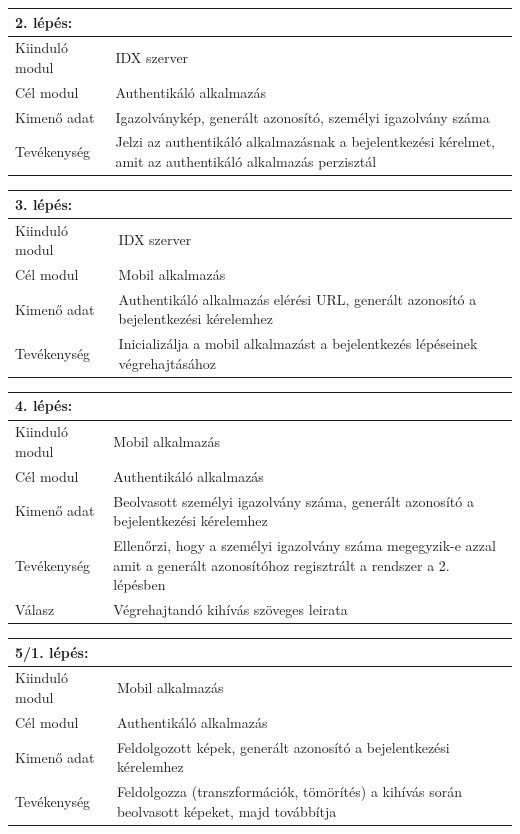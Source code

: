 \begin{tabular}{|p{3cm}|p{10cm} |}
   	\hline
	\textbf{2. lépés:} & \textbf{}\\ \hline
	Kiinduló modul & IDX szerver \\ \hline
	Cél modul & Authentikáló alkalmazás \\ \hline
	Kimenő adat & Igazolványkép, generált azonosító, személyi igazolvány száma \\ \hline
	Tevékenység & Jelzi az authentikáló alkalmazásnak a bejelentkezési kérelmet, amit az authentikáló alkalmazás perzisztál\\ \hline
\end{tabular}


\begin{tabular}{|p{3cm}|p{10cm} |}
   	\hline
	\textbf{3. lépés:} & \textbf{}\\ \hline
	Kiinduló modul & IDX szerver \\ \hline
	Cél modul & Mobil alkalmazás \\ \hline
	Kimenő adat & Authentikáló alkalmazás elérési URL, generált azonosító a bejelentkezési kérelemhez \\ \hline
	Tevékenység & Inicializálja a mobil alkalmazást a bejelentkezés lépéseinek végrehajtásához\\ \hline
\end{tabular}

\begin{tabular}{|p{3cm}|p{10cm} |}
   	\hline
	\textbf{4. lépés:} & \textbf{}\\ \hline
	Kiinduló modul & Mobil alkalmazás \\ \hline
	Cél modul & Authentikáló alkalmazás \\ \hline
	Kimenő adat & Beolvasott személyi igazolvány száma, generált azonosító a bejelentkezési kérelemhez \\ \hline
	Tevékenység & Ellenőrzi, hogy a személyi igazolvány száma megegyzik-e azzal amit a generált azonosítóhoz regisztrált a rendszer  a 2. lépésben\\ \hline
	Válasz & Végrehajtandó kihívás szöveges leirata\\ \hline
\end{tabular}


\begin{tabular}{|p{3cm}|p{10cm} |}
   	\hline
	\textbf{5/1. lépés:} & \textbf{}\\ \hline
	Kiinduló modul & Mobil alkalmazás \\ \hline
	Cél modul & Authentikáló alkalmazás \\ \hline
	Kimenő adat & Feldolgozott képek, generált azonosító a bejelentkezési kérelemhez \\ \hline
	Tevékenység & Feldolgozza (transzformációk, tömörítés) a kihívás során beolvasott képeket, majd továbbítja\\ \hline
\end{tabular}


